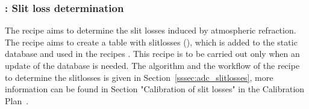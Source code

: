 \subsubsection{: Slit loss determination}
The recipe  aims to determine the slit losses induced by atmospheric refraction. The recipe aims to create a table with slitlosses (), which is added to the static database and used in the recipes . This recipe is to be carried out only when an update of the database is needed. The algorithm and the workflow of the recipe to determine the slitlosses is given in Section~\ref{sssec:adc_slitlosses}, more information can be found in Section "Calibration of slit losses" in the Calibration Plan~\cite{METIS-calibration_plan}. 

